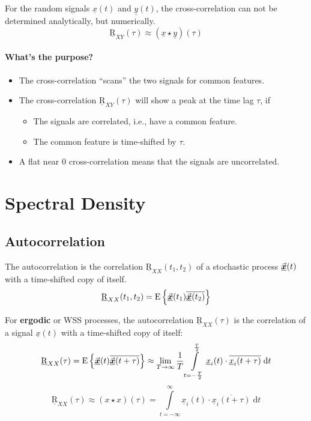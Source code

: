 \begin{refsection}
For the random signals $\underline{x}(t)$ and $\underline{y}(t)$, the cross-correlation can not be determined analytically, but numerically.
\begin{equation}
	\underline{\mathrm{R}}_{XY}(\tau) \approx \left(\underline{x} \star \underline{y}\right)(\tau)
\end{equation}

\paragraph{What's the purpose?}

\begin{itemize}
	\item The cross-correlation ``scans'' the two signals for common features.
	\item The cross-correlation $\underline{\mathrm{R}}_{XY}(\tau)$ will show a peak at the time lag $\tau$, if
	\begin{itemize}
		\item The signals are correlated, i.e., have a common feature.
		\item The common feature is time-shifted by $\tau$.
	\end{itemize}
	\item A flat near $0$ cross-correlation means that the signals are uncorrelated.
\end{itemize}

\section{Spectral Density}

\subsection{Autocorrelation}

The autocorrelation is the correlation $\underline{\mathrm{R}}_{XX}(t_1, t_2)$ of a stochastic process $\vec{\bm{\underline{x}}}(t)$ with a time-shifted copy of itself.
\begin{equation}
	\underline{\mathrm{R}}_{XX}(t_1, t_2) = \mathrm{E}\left\{ \vec{\bm{\underline{x}}}(t_1) \overline{\vec{\bm{\underline{x}}}(t_2)} \right\}
\end{equation}

For \textbf{ergodic} or \ac{WSS} processes, the autocorrelation $\underline{\mathrm{R}}_{XX}(\tau)$ is the correlation of a signal $\underline{x}(t)$ with a time-shifted copy of itself:
\begin{equation}
	\underline{\mathrm{R}}_{XX}(\tau) = \mathrm{E}\left\{ \vec{\bm{\underline{x}}}(t) \overline{\vec{\bm{\underline{x}}}(t+\tau)} \right\} \approx \lim\limits_{T \rightarrow \infty} \frac{1}{T} \int\limits_{t = -\frac{T}{2}}^{\frac{T}{2}} \underline{x}_i(t) \cdot \overline{\underline{x}_i(t+\tau)} \; \mathrm{d} t
\end{equation}
\begin{equation}
	\underline{\mathrm{R}}_{XX}(\tau) \approx \left(x \star x\right)(\tau) = \int\limits_{t = -\infty}^{\infty} \underline{x}_i(t) \cdot \overline{\underline{x}_i(t+\tau)} \; \mathrm{d} t
\end{equation}


\end{refsection}
